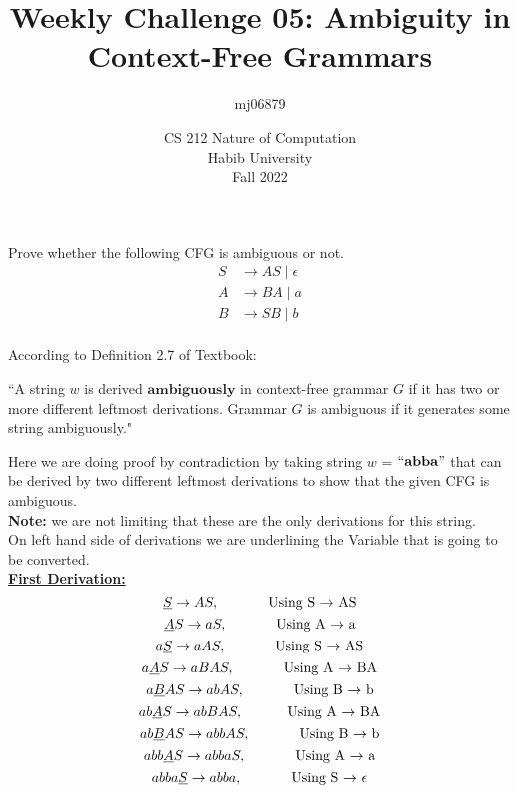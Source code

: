 \documentclass[a4paper]{exam}
\title{Weekly Challenge 05: Ambiguity in Context-Free Grammars}
\author{mj06879} %
\date{CS 212 Nature of Computation\\Habib University\\Fall 2022}
\begin{document}
\maketitle

\begin{questions}
  

  Prove whether the following CFG is ambiguous or not.
  \begin{align*}
    S & \to AS \mid \epsilon\\
    A & \to BA \mid a\\
    B & \to SB \mid b\\
  \end{align*}
  
  \begin{solution}
    According to Definition 2.7 of Textbook:
    \begin{center}
    ``A string $w$ is derived $\mathbf{ambiguously}$ in context-free grammar $G$ if
it has two or more different leftmost derivations. Grammar $G$ is
ambiguous if it generates some string ambiguously."
    \end{center}
Here we are doing proof by contradiction by taking string $w$ = $``\mathbf{abba}"$ that can be derived by two different leftmost derivations to show that the given CFG is ambiguous. \\
\textbf{Note:} we are not limiting that these are the only derivations for this string.\\
On left hand side of derivations we are underlining the Variable that is going to be converted.\\
\underline{\textbf{First Derivation:}}
\[ \underline{S} \to AS , \text{ \hspace{1cm} Using S $\to$ AS}\]
\[  \underline{A}S \to aS , \text{ \hspace{1cm} Using A $\to$ a}\]
\[ a \underline{S} \to aAS, \text{ \hspace{1cm} Using S $\to$ AS}\]
\[ a \underline{A}S \to aBAS,  \text{ \hspace{1cm} Using A $\to$ BA}\]
\[ a \underline{B}AS \to abAS, \text{ \hspace{1cm} Using B $\to$ b} \]
\[ ab \underline{A}S \to abBAS, \text{\hspace{1cm} Using A $\to$ BA} \]
\[ ab \underline{B}AS  \to abbAS, \text{ \hspace{1cm} Using B $\to$ b}\]
\[ abb \underline{A}S \to abbaS , \text{ \hspace{1cm} Using A $\to$ a}\]
\[ abba \underline{S} \to abba  , \text{ \hspace{1cm} Using S $\to$ $\epsilon$}\]


\end{solution}
\end{questions}
\end{document}
